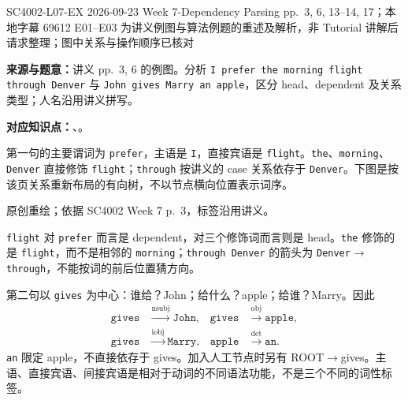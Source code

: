 

\examplemeta
  {SC4002-L07-EX}
  {2026-09-23}
  {Week 7-Dependency Parsing pp.~3, 6, 13--14, 17；本地字幕 69612}
  {E01--E03 为讲义例图与算法例题的重述及解析，非 Tutorial}
  {讲解后请求整理；图中关系与操作顺序已核对}


\textbf{来源与题意：}讲义 pp.~3, 6 的例图。分析 \texttt{I prefer the morning flight through Denver} 与 \texttt{John gives Marry an apple}，区分 head、dependent 及关系类型；人名沿用讲义拼写。

\textbf{对应知识点：}、。

\begin{workedsolution}
第一句的主要谓词为 \texttt{prefer}，主语是 \texttt{I}，直接宾语是 \texttt{flight}。\texttt{the}、\texttt{morning}、\texttt{Denver} 直接修饰 \texttt{flight}；\texttt{through} 按讲义的 case 关系依存于 \texttt{Denver}。下图是按该页关系重新布局的有向树，不以节点横向位置表示词序。

\begin{center}


{\small 原创重绘；依据 SC4002 Week 7 p.~3，标签沿用讲义。}
\end{center}

\texttt{flight} 对 \texttt{prefer} 而言是 dependent，对三个修饰词而言则是 head。\texttt{the} 修饰的是 \texttt{flight}，而不是相邻的 \texttt{morning}；\texttt{through Denver} 的箭头为 \texttt{Denver}$\rightarrow$\texttt{through}，不能按词的前后位置猜方向。

第二句以 \texttt{gives} 为中心：谁给？John；给什么？apple；给谁？Marry。因此
\[
\begin{aligned}
\texttt{gives}&\xrightarrow{\mathrm{nsubj}}\texttt{John}, &
\texttt{gives}&\xrightarrow{\mathrm{obj}}\texttt{apple},\\
\texttt{gives}&\xrightarrow{\mathrm{iobj}}\texttt{Marry}, &
\texttt{apple}&\xrightarrow{\mathrm{det}}\texttt{an}.
\end{aligned}
\]
\texttt{an} 限定 apple，不直接依存于 gives。加入人工节点时另有 ROOT$\rightarrow$gives。主语、直接宾语、间接宾语是相对于动词的不同语法功能，不是三个不同的词性标签。
\end{workedsolution}

